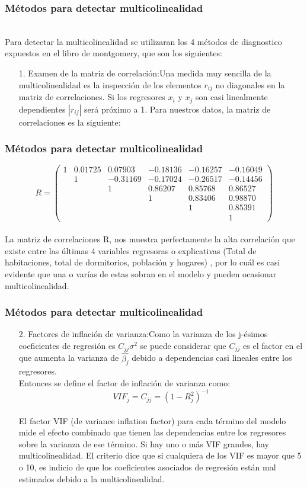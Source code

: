 \documentclass[12pt]{beamer}
\begin{document}
\begin{frame}
\frametitle{Métodos para detectar multicolinealidad}
~\\Para detectar la multicolinealidad se utilizaran los 4 métodos de diagnostico expuestos en el libro de montgomery, que son los siguientes:
\begin{itemize}
\item[1.]Examen de la matriz de correlación:Una medida muy sencilla de la multicolinealidad es la inspección de los elementos $r_{ij}$ no diagonales en la matriz de correlaciones. Si los regresores $x_{i}$ y $x_{j}$ son casi linealmente dependientes $|r_{ij}|$ será próximo a 1. Para nuestros datos, la matriz de correlaciones es la siguiente:
\end{itemize}
\end{frame}

\begin{frame}
\frametitle{Métodos para detectar multicolinealidad}

\[R=
\left( \begin{array}{cccccc}
 1 & 0.01725 & 0.07903 & -0.18136 & -0.16257 & -0.16049 \\ 
   & 1       & -0.31169& -0.17024 & -0.26517 & -0.14456 \\
   &         & 1       & 0.86207  & 0.85768  & 0.86527 \\
   &         &         & 1        & 0.83406  & 0.98870 \\
   &         &         &          & 1        & 0.85391 \\
   &         &         &          &          & 1
\end{array} \right) \]
~\\La matriz de correlaciones R, nos muestra perfectamente la alta correlación que existe entre las últimas 4 variables regresoras o explicativas (Total de habitaciones, total de dormitorios, población y hogares) , por lo cuál es casi evidente que una o varías de estas sobran en el modelo y pueden ocasionar multicolinealidad.
\end{frame}

\begin{frame}
\frametitle{Métodos para detectar multicolinealidad}
\begin{itemize}
\item[2.]Factores de inflación de varianza:Como la varianza de los j-ésimos coeficientes de regresión es $C_{jj}\sigma^2$ se puede considerar que $C_{jj}$ es el factor en el que aumenta la varianza de $\hat{\beta_{j}}$ debido a dependencias casi lineales entre los regresores.
~\\Entonces se define el factor de inflación de varianza como: 
$$VIF_{j}=C_{jj}=(1-R^2_{j})^{-1}$$
~\\El factor VIF (de variance inflation factor) para cada término del modelo mide el efecto combinado que tienen las dependencias entre los regresores sobre la varianza de ese término. Si hay uno o más VIF grandes, hay multicolinealidad. El criterio dice que si cualquiera de los VIF es mayor que 5 o 10, es indicio de que los coeficientes asociados de regresión están mal estimados debido a la multicolinealidad.
\end{itemize}
\end{frame}
\end{document}
